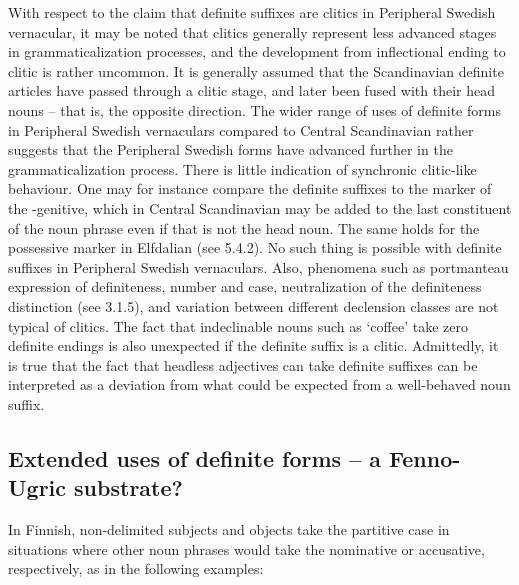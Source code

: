With respect to the claim that definite suffixes are clitics in Peripheral Swedish vernacular, it may be noted that clitics generally represent less advanced stages in grammaticalization processes, and the development from inflectional ending to clitic is rather uncommon. It is generally assumed that the Scandinavian definite articles have passed through a clitic stage, and later been fused with their head nouns – that is, the opposite direction. The wider range of uses of definite forms in Peripheral Swedish vernaculars compared to Central Scandinavian rather suggests that the Peripheral Swedish forms have advanced further in the grammaticalization process. There is little indication of synchronic clitic-like behaviour. One may for instance compare the definite suffixes to the marker of the -genitive, which in Central Scandinavian may be added to the last constituent of the noun phrase even if that is not the head noun. The same holds for the possessive marker  in Elfdalian (see 5.4.2). No such thing is possible with definite suffixes in Peripheral Swedish vernaculars. Also, phenomena such as portmanteau expression of definiteness, number and case, neutralization of the definiteness distinction (see 3.1.5), and variation between different declension classes are not typical of clitics. The fact that indeclinable nouns such as  ‘coffee’ take zero definite endings is also unexpected if the definite suffix is a clitic. Admittedly, it is true that the fact that headless adjectives can take definite suffixes can be interpreted as a deviation from what could be expected from a well-behaved noun suffix.


\subsection{\rmfamily Extended uses of definite forms – a Fenno-Ugric substrate?}

In Finnish, non-delimited subjects and objects take the partitive case in situations where other noun phrases would take the nominative or accusative, respectively, as in the following examples:


